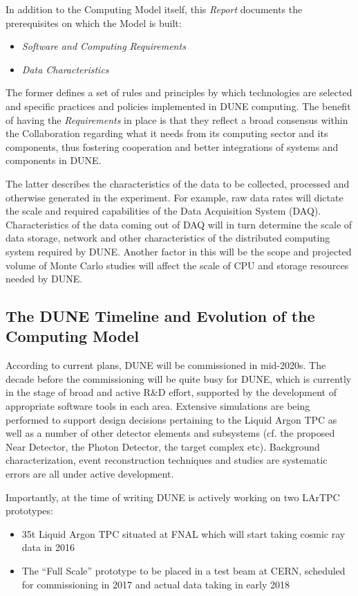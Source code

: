 In addition to the Computing Model itself, this \textit{Report} documents the prerequisites on which the Model is built:
\begin{itemize}
\item \textit{Software and Computing Requirements}
\item \textit{Data Characteristics}
\end{itemize}

The former defines a set of rules and principles by which technologies are selected and specific practices and policies implemented in DUNE computing.
The benefit of having the \textit{Requirements} in place is that they reflect a broad consensus within the Collaboration regarding what it needs from
its computing sector and its components, thus fostering cooperation and better integrations of systems and components in DUNE.

The latter describes the characteristics of the data to be collected, processed and otherwise generated in the experiment.
For example, raw data rates will dictate the scale and required capabilities of the Data Acquisition System (DAQ). 
Characteristics of the data coming out of DAQ will in turn determine the scale of data storage, network and other characteristics of the
distributed computing system required by DUNE. Another factor in this will be the scope and projected volume of Monte Carlo studies 
will affect the scale of CPU and storage resources needed by DUNE.




\subsection{The DUNE Timeline and Evolution of the Computing Model}
According to current plans, DUNE will be commissioned in mid-2020s. The decade before the commissioning will be quite busy
for DUNE, which is currently in the stage of broad and active R\&D effort, supported by the development of appropriate 
software tools in each area. Extensive simulations are being performed to support design decisions pertaining to the Liquid 
Argon TPC as well as a number of other detector elements and subsystems (cf. the proposed Near Detector, the Photon Detector, 
the target complex etc). Background characterization, event reconstruction techniques and studies are systematic errors are all under active development.

Importantly, at the time of writing DUNE is actively working on two LArTPC prototypes:
\begin{itemize}
\item 35t Liquid Argon TPC situated at FNAL which will start taking cosmic ray data in 2016
\item The ``Full Scale'' prototype to be placed in a test beam at CERN, scheduled for commissioning in 2017 and actual data taking in early 2018
\end{itemize}

